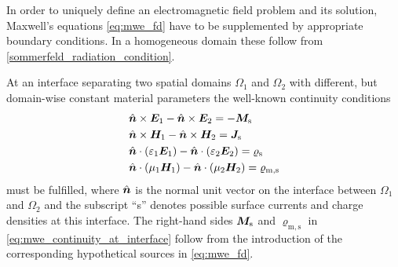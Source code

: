 In order to uniquely define an electromagnetic field problem and its solution,
Maxwell's equations \eqref{eq:mwe_fd} have to be supplemented by appropriate
boundary conditions.
In a homogeneous domain these follow from
\cref{sommerfeld_radiation_condition}.

At an interface separating two spatial domains $\Omega_1$ and $\Omega_2$ with
different, but domain-wise constant material parameters the well-known
continuity conditions \cite[pp.~20]{Jackson2013}
\begin{subequations}\label{eq:mwe_continuity_at_interface}
	\begin{align}
		&\uv{n} \times \pvec{E}_1 - \uv{n} \times \pvec{E}_2 =
		- \pvec{M}_\mathrm{s} \\
		&\uv{n} \times \pvec{H}_1 - \uv{n} \times \pvec{H}_2 =
		\pvec{J}_\mathrm{s} \\
		&\uv{n} \cdot \left(\varepsilon_1 \pvec{E}_1\right) -
		\uv{n} \cdot \left(\varepsilon_2 \pvec{E}_2\right) = 
		\varrho_\mathrm{s} \\
		&\uv{n} \cdot \left(\mu_1 \pvec{H}_1\right) -
		\uv{n} \cdot \left(\mu_2 \pvec{H}_2\right) = 
		\varrho_\mathrm{m,s} \\
	\end{align}
\end{subequations}
must be fulfilled, where $\uv{n}$ is the normal unit vector on the interface
between $\Omega_1$ and $\Omega_2$ and the subscript \enquote{s} denotes
possible surface currents and charge densities at this interface.
The right-hand sides $\pvec{M}_\mathrm{s}$ and $\varrho_\mathrm{m,s}$
in \eqref{eq:mwe_continuity_at_interface} follow from the introduction of
the corresponding hypothetical sources in \eqref{eq:mwe_fd}.

